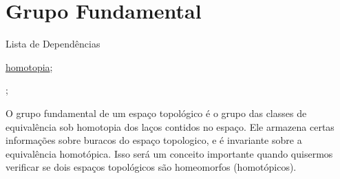 \section{Grupo Fundamental}
\label{grupo-fundamental}

\begin{titlemize}{Lista de Dependências}
	\item \hyperref[Homotopia]{homotopia};\\ %
	\item \hyperref[]{};
\end{titlemize}

O grupo fundamental de um espaço topológico é o grupo das classes de equivalência sob homotopia dos laços contidos no espaço. Ele armazena certas informações sobre buracos do espaço topologico, e é invariante sobre a equivalência homotópica. Isso será um conceito importante quando quisermos verificar se dois espaços topológicos são homeomorfos (homotópicos).






